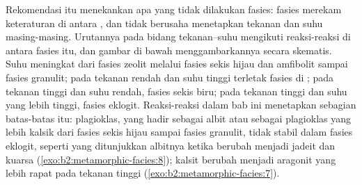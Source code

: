 Rekomendasi itu menekankan apa yang tidak dilakukan fasies: fasies merekam keteraturan di antara
, dan tidak berusaha menetapkan tekanan dan suhu masing-masing. Urutannya pada
bidang tekanan--suhu mengikuti reaksi-reaksi di antara fasies itu, dan
gambar di bawah menggambarkannya secara skematis. Suhu meningkat dari fasies zeolit melalui
fasies sekis hijau dan amfibolit sampai fasies granulit; pada tekanan rendah dan suhu
tinggi terletak fasies  di ; pada tekanan tinggi dan suhu
rendah, fasies sekis biru; pada tekanan tinggi dan suhu yang lebih tinggi, fasies
eklogit. Reaksi-reaksi dalam bab ini menetapkan sebagian batas-batas itu: plagioklas, yang
hadir sebagai albit atau sebagai plagioklas yang lebih kalsik dari fasies sekis hijau sampai fasies granulit,
tidak stabil dalam fasies eklogit, seperti yang ditunjukkan
albitnya ketika berubah menjadi jadeit dan kuarsa (\cref{exo:b2:metamorphic-facies:8}); kalsit berubah menjadi
aragonit yang lebih rapat pada tekanan tinggi (\cref{exo:b2:metamorphic-facies:7}).

